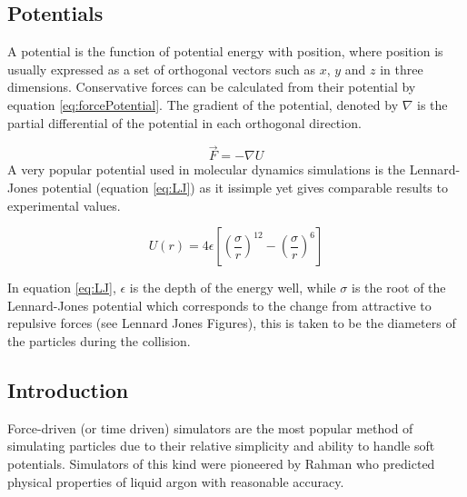 \documentclass[12pt]{UoAthesis}
\begin{document}
\subsection{Potentials} A potential is the function of potential energy with
position, where position is usually expressed as a set of orthogonal vectors
such as $x$, $y$ and $z$ in three dimensions. Conservative forces can be
calculated from their potential by equation \ref{eq:forcePotential}. The
gradient of the potential, denoted by $\nabla$ is the partial differential of
the potential in each orthogonal direction.

\begin{equation} \vec{F}=-\nabla U \label{eq:forcePotential} \end{equation}
A very popular potential used in molecular dynamics simulations is the
Lennard-Jones potential \cite{Lennard-Jones1924} (equation \ref{eq:LJ}) as it
issimple yet gives comparable results to experimental values.

\begin{equation} U(r) = 4 \epsilon \left[ \left( \frac{\sigma}{r} \right)^{12}
-\left( \frac{\sigma}{r} \right)^{6} \right] \label{eq:LJ} \end{equation}

In equation \ref{eq:LJ}, $\epsilon$ is the depth of the energy well, while
$\sigma$ is the root of the Lennard-Jones potential which corresponds to the
change from attractive to repulsive forces (see Lennard Jones Figures), this is
taken to be the diameters of the particles during the collision.
% 
\subsection{Introduction} 
Force-driven (or time driven) simulators are the most
popular method of simulating particles due to their relative simplicity and
ability to handle soft potentials. Simulators of this kind were pioneered by
Rahman \cite{Rahman1964} who predicted physical properties of liquid argon with
reasonable accuracy.
\end{document}
